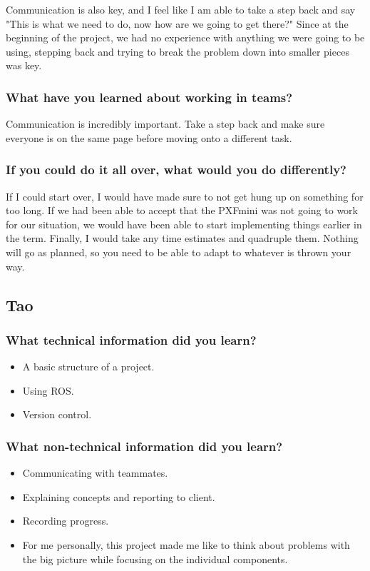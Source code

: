 \documentclass[compsoc,draftclsnofoot,onecolumn,10pt]{IEEEtran}
\begin{document}
Communication is also key, and I feel like I am able to take a step back and say "This is what we need to do, now how are we going to get there?" Since at the beginning of the project, we had no experience with anything we were going to be using, stepping back and trying to break the problem down into smaller pieces was key.

\subsubsection*{What have you learned about working in teams?}
Communication is incredibly important. Take a step back and make sure everyone is on the same page before moving onto a different task.

\subsubsection*{If you could do it all over, what would you do differently?}
If I could start over, I would have made sure to not get hung up on something for too long. If we had been able to accept that the PXFmini was not going to work for our situation, we would have been able to start implementing things earlier in the term.
Finally, I would take any time estimates and quadruple them. Nothing will go as planned, so you need to be able to adapt to whatever is thrown your way.


\subsection{Tao}

\subsubsection*{What technical information did you learn?}
\begin{itemize}
    \item A basic structure of a project.
    \item Using ROS.
    \item Version control.
\end{itemize}

\subsubsection*{What non-technical information did you learn?}
\begin{itemize}
    \item Communicating with teammates.
    \item Explaining concepts and reporting to client.
    \item Recording progress.
    \item For me personally, this project made me like to think about
    problems with the big picture while focusing on the individual components.
\end{itemize}
\end{document}
